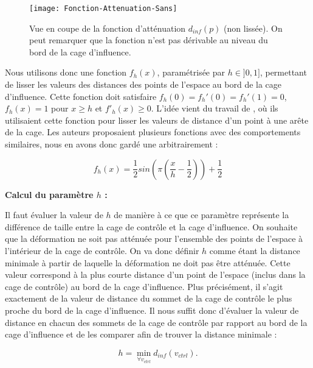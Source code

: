 \begin{figure}[ht]
\begin{center}
\texttt{[image: Fonction-Attenuation-Sans]}

\caption[Fonction d'atténuation (non lissée)] {Vue en coupe de la fonction
d'atténuation $d_{inf}(p)$ (non lissée). On peut remarquer que la fonction
n'est pas dérivable au niveau du bord de la cage d'influence.}

\label{MELAtN}

\end{center}
\end{figure}

Nous utilisons donc une fonction $f_h(x)$, paramétrisée par $h \in ]0, 1]$,
permettant de lisser les valeurs des distances des points de l'espace au bord de
la cage d'influence. Cette fonction doit satisfaire $f_h(0) = f_h'(0) =
f_h'(1) = 0$, $f_h(x)=1$ pour $x \geq h$ et $f'_h(x) \geq 0$. L'idée vient du
travail de \cite{GPCP13}, où ils utilisaient cette fonction pour lisser les
valeurs de distance d'un point à une arête de la cage. Les auteurs proposaient
plusieurs fonctions avec des comportements similaires, nous en avons donc
gardé une arbitrairement :

\begin{equation}
  f_h(x) = \frac{1}{2} sin(\pi(\frac{x}{h} - \frac{1}{2})) + \frac{1}{2}
\end{equation}

\textbf{Calcul du paramètre $h$ :}

Il faut évaluer la valeur de $h$ de manière à ce que ce paramètre représente
la différence de taille entre la cage de contrôle et la cage d'influence. On
souhaite que la déformation ne soit pas atténuée pour l'ensemble des points de
l'espace à l'intérieur de la cage de contrôle. On va donc définir $h$ comme
étant la distance minimale à partir de laquelle la déformation ne doit pas
être atténuée. Cette valeur correspond à la plus courte distance d'un point de
l'espace (inclus dans la cage de contrôle) au bord de la cage d'influence.
Plus précisément, il s'agit exactement de la valeur de distance du sommet de
la cage de contrôle le plus proche du bord de la cage d'influence. Il nous
suffit donc d'évaluer la valeur de distance en chacun des sommets de la cage
de contrôle par rapport au bord de la cage d'influence et de les comparer afin
de trouver la distance minimale :

\begin{equation}
  h = \min_{\forall v_{ctrl}} d_{inf}(v_{ctrl}).
\end{equation}

